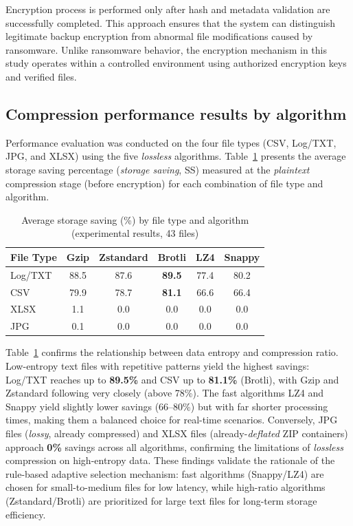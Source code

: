 \documentclass{iaesarticle}
\begin{document}
Encryption process is performed only after hash and metadata validation are successfully completed. This approach ensures that the system can distinguish legitimate backup encryption from abnormal file modifications caused by ransomware. Unlike ransomware behavior, the encryption mechanism in this study operates within a controlled environment using authorized encryption keys and verified files.

\subsection{Compression performance results by algorithm}
Performance evaluation was conducted on the four file types (CSV, Log/TXT, JPG, and XLSX) using the five \textit{lossless} algorithms. Table~\ref{tab:compression_results} presents the average storage saving percentage (\textit{storage saving}, SS) measured at the \textit{plaintext} compression stage (before encryption) for each combination of file type and algorithm.

\begin{table}[H]
\centering
\fontsize{8pt}{10pt}\selectfont
\caption{Average storage saving (\%) by file type and algorithm (experimental results, 43 files)}
\label{tab:compression_results}
\begin{tabular}{l c c c c c}
\hline
\textbf{File Type} & \textbf{Gzip} & \textbf{Zstandard} & \textbf{Brotli} & \textbf{LZ4} & \textbf{Snappy} \\
\hline
Log/TXT & 88.5 & 87.6 & \textbf{89.5} & 77.4 & 80.2 \\
CSV     & 79.9 & 78.7 & \textbf{81.1} & 66.6 & 66.4 \\
XLSX    & 1.1  & 0.0  & 0.0  & 0.0  & 0.0  \\
JPG     & 0.1  & 0.0  & 0.0  & 0.0  & 0.0  \\
\hline
\end{tabular}
\end{table}

Table~\ref{tab:compression_results} confirms the relationship between data entropy and compression ratio. Low-entropy text files with repetitive patterns yield the highest savings: Log/TXT reaches up to \textbf{89.5\%} and CSV up to \textbf{81.1\%} (Brotli), with Gzip and Zstandard following very closely (above 78\%). The fast algorithms LZ4 and Snappy yield slightly lower savings (66--80\%) but with far shorter processing times, making them a balanced choice for real-time scenarios. Conversely, JPG files (\textit{lossy}, already compressed) and XLSX files (already-\textit{deflated} ZIP containers) approach \textbf{0\%} savings across all algorithms, confirming the limitations of \textit{lossless} compression on high-entropy data. These findings validate the rationale of the rule-based adaptive selection mechanism: fast algorithms (Snappy/LZ4) are chosen for small-to-medium files for low latency, while high-ratio algorithms (Zstandard/Brotli) are prioritized for large text files for long-term storage efficiency.
\end{document}
